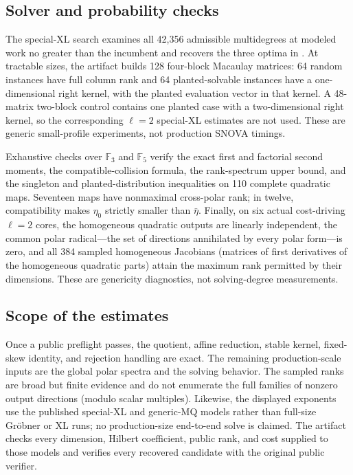 \documentclass[11pt]{article}
\newcommand{\F}{\mathbb F}
\begin{document}
\subsection{Solver and probability checks}

The special-XL search examines all 42,356 admissible multidegrees at modeled
work no greater than the incumbent and recovers the three optima in
.  At tractable sizes, the artifact builds 128 four-block
Macaulay matrices: 64 random instances have full column rank and 64
planted-solvable instances have a one-dimensional right kernel, with the
planted evaluation vector in that kernel.  A 48-matrix two-block control
contains one planted case with a two-dimensional right kernel, so the
corresponding $\ell=2$ special-XL estimates are not used.  These are generic small-profile
experiments, not production SNOVA timings.

Exhaustive checks over $\F_3$ and $\F_5$ verify the exact first and factorial
second moments, the compatible-collision formula, the rank-spectrum upper bound,
and the singleton and planted-distribution inequalities on 110 complete
quadratic maps.  Seventeen maps have nonmaximal cross-polar rank; in twelve,
compatibility makes $\eta_0$ strictly smaller than $\bar\eta$.  Finally, on six actual cost-driving $\ell=2$ cores, the homogeneous
quadratic outputs are linearly independent, the common polar radical---the set
of directions annihilated by every polar form---is zero, and all 384 sampled
homogeneous Jacobians (matrices of first derivatives of the homogeneous
quadratic parts) attain the maximum rank permitted by their dimensions.  These
are genericity diagnostics, not solving-degree measurements.

\subsection{Scope of the estimates}

Once a public preflight passes, the quotient, affine reduction, stable kernel,
fixed-skew identity, and rejection handling are exact.  The remaining
production-scale inputs are the global polar spectra and the solving behavior.
The sampled ranks are broad but finite evidence and do not enumerate the full
families of nonzero output directions (modulo scalar multiples).  Likewise, the displayed exponents use the published special-XL and
generic-MQ models rather than full-size Gr\"obner or XL runs; no
production-size end-to-end solve is claimed.  The artifact
checks every dimension, Hilbert coefficient, public rank, and cost supplied to
those models and verifies every recovered candidate with the original public
verifier.
\end{document}
